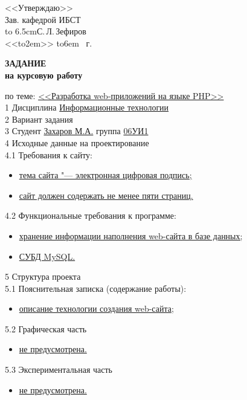 \hfill\parbox{6.5cm}{
	<<Утверждаю>>\\
	Зав. кафедрой ИБСТ\\
	\hbox to 6.5cm{\hrulefill С.\,Л.\,Зефиров}\\
	\def\hrf#1{\hbox to#1{\hrulefill}}
	<<\hrf{2em}>> \hrf{6em} \the\year~г.}	
	
      \begin{center}\textbf{\normalfont\bfseries\large ЗАДАНИЕ}\\\textbf{на
        курсовую работу}\end{center}

\noindent по теме: \uline{<<Разработка web-приложений на языке PHP>>\hfill}\\
1 Дисциплина \uline{\qquad Информационные технологии\hfill}\\
2 Вариант задания \uline{\hfill}\\
3 Студент \uline{\qquad Захаров М.А.\qquad } группа \uline{\qquad 06УИ1\hfill}\\
4 Исходные данные на проектирование\\
4.1 Требования к сайту:
\begin{itemize}
\item \uline{тема сайта "--- электронная цифровая подпись;\hfill\quad}
\item \uline{сайт должен содержать не менее пяти страниц.\hfill\quad}
\end{itemize}
4.2 Функциональные требования к программе:
\begin{itemize}
\item \uline{хранение информации наполнения web-сайта в базе данных;
    \hfill \quad}
\item \uline{СУБД MySQL.\hfill \quad}
\end{itemize}
5 Структура проекта\\
5.1 Пояснительная записка (содержание работы):
\begin{itemize}
\item \uline{описание технологии создания web-сайта; \hfill \quad}
\end{itemize}
5.2 Графическая часть
\begin{itemize}
\item \uline{не предусмотрена.\hfill}
\end{itemize}
5.3 Экспериментальная часть
\begin{itemize}
\item \uline{не предусмотрена.\hfill}
\end{itemize}
